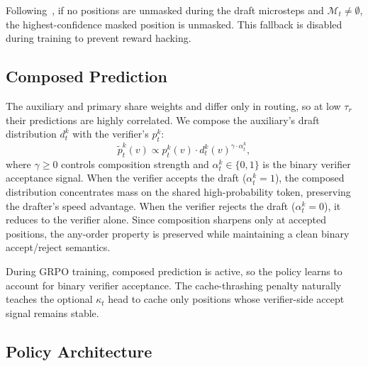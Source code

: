 \documentclass[11pt]{article}
\newcommand{\cM}{\mathcal{M}}
\begin{document}
Following~\cite{jazbec2025learning}, if no positions are unmasked during the draft microsteps and $\cM_t \neq \emptyset$, the highest-confidence masked position is unmasked.
This fallback is disabled during training to prevent reward hacking.

\subsection{Composed Prediction}
\label{sec:composed}

The auxiliary and primary share weights and differ only in routing, so at low $\tau_r$ their predictions are highly correlated.
We compose the auxiliary's draft distribution $d_t^k$ with the verifier's $p_t^k$:
\begin{equation}
    \tilde{p}_t^k(v) \propto p_t^k(v) \cdot d_t^k(v)^{\gamma \cdot \alpha_t^k},
    \label{eq:composed}
\end{equation}
where $\gamma \geq 0$ controls composition strength and $\alpha_t^k \in \{0,1\}$ is the binary verifier acceptance signal.
When the verifier accepts the draft ($\alpha_t^k = 1$), the composed distribution concentrates mass on the shared high-probability token, preserving the drafter's speed advantage.
When the verifier rejects the draft ($\alpha_t^k = 0$), it reduces to the verifier alone.
Since composition sharpens only at accepted positions, the any-order property is preserved while maintaining a clean binary accept/reject semantics.

During GRPO training, composed prediction is active, so the policy learns to account for binary verifier acceptance.
The cache-thrashing penalty naturally teaches the optional $\kappa_t$ head to cache only positions whose verifier-side accept signal remains stable.

\subsection{Policy Architecture}
\label{sec:architecture}
\end{document}

